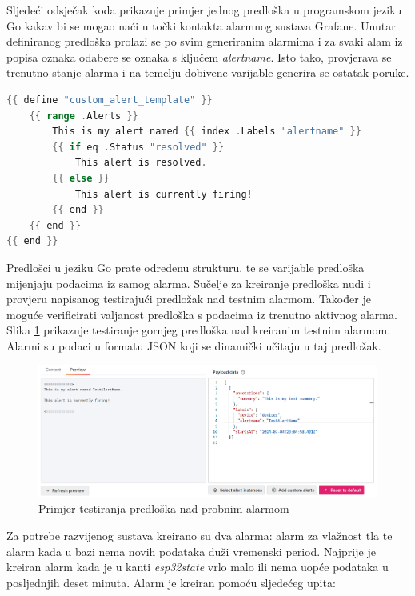 Sljedeći odsječak koda prikazuje primjer jednog predloška u programskom jeziku Go kakav bi se mogao naći u točki kontakta alarmnog sustava Grafane. Unutar definiranog predloška prolazi se po svim generiranim alarmima i za svaki alam iz popisa oznaka odabere se oznaka s ključem \textit{alertname}. Isto tako, provjerava se trenutno stanje alarma i na temelju dobivene varijable generira se ostatak poruke. 

\begin{lstlisting}[caption={Primjer predloška u programskom jeziku Go}, language=go]
{{ define "custom_alert_template" }}
	{{ range .Alerts }}
		This is my alert named {{ index .Labels "alertname" }}
		{{ if eq .Status "resolved" }}
			This alert is resolved.
		{{ else }}
			This alert is currently firing!
		{{ end }}
	{{ end }}
{{ end }}
\end{lstlisting}

Predlošci u jeziku Go prate određenu strukturu, te se varijable predloška mijenjaju podacima iz samog alarma. Sučelje za kreiranje predloška nudi i provjeru napisanog testirajući predložak nad testnim alarmom. Također je moguće verificirati valjanost predloška s podacima iz trenutno aktivnog alarma. Slika \ref{fig:grafana_templating} prikazuje testiranje gornjeg predloška nad kreiranim testnim alarmom. Alarmi su podaci u formatu JSON koji se dinamički učitaju u taj predložak.

\begin{figure}[ht]
	\centering
	\includegraphics[scale=0.4]{imgs/grafana_templating}
	\caption{Primjer testiranja predloška nad probnim alarmom}
	\label{fig:grafana_templating}
\end{figure}

Za potrebe razvijenog sustava kreirano su dva alarma: alarm za vlažnost tla te alarm kada u bazi nema novih podataka duži vremenski period. Najprije je kreiran alarm kada je u kanti \textit{esp32state} vrlo malo ili nema uopće podataka u posljednjih deset minuta. Alarm je kreiran pomoću sljedećeg upita:

